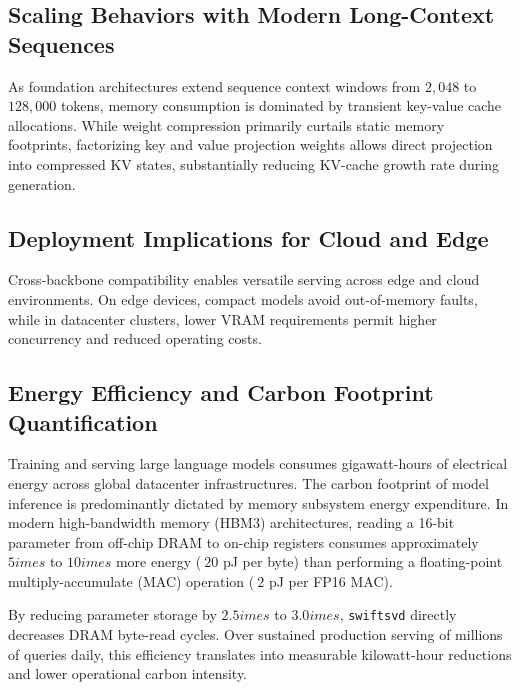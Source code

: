 \subsection{Scaling Behaviors with Modern Long-Context Sequences}
As foundation architectures extend sequence context windows from $2{,}048$ to $128{,}000$ tokens, memory consumption is dominated by transient key-value cache allocations. While weight compression primarily curtails static memory footprints, factorizing key and value projection weights allows direct projection into compressed KV states, substantially reducing KV-cache growth rate during generation.

\subsection{Deployment Implications for Cloud and Edge}
Cross-backbone compatibility enables versatile serving across edge and cloud environments. On edge devices, compact models avoid out-of-memory faults, while in datacenter clusters, lower VRAM requirements permit higher concurrency and reduced operating costs.

\subsection{Energy Efficiency and Carbon Footprint Quantification}
Training and serving large language models consumes gigawatt-hours of electrical energy across global datacenter infrastructures. The carbon footprint of model inference is predominantly dictated by memory subsystem energy expenditure. In modern high-bandwidth memory (HBM3) architectures, reading a 16-bit parameter from off-chip DRAM to on-chip registers consumes approximately $5	imes$ to $10	imes$ more energy ($~20$ pJ per byte) than performing a floating-point multiply-accumulate (MAC) operation ($~2$ pJ per FP16 MAC).

By reducing parameter storage by $2.5	imes$ to $3.0	imes$, \texttt{swiftsvd} directly decreases DRAM byte-read cycles. Over sustained production serving of millions of queries daily, this efficiency translates into measurable kilowatt-hour reductions and lower operational carbon intensity.
